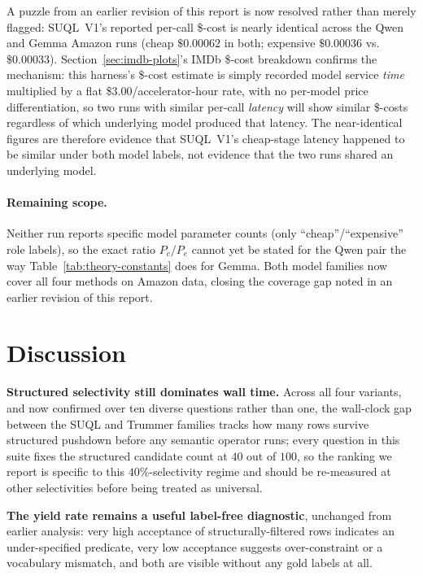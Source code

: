 A puzzle from an earlier revision of this report is now resolved rather
than merely flagged: SUQL~V1's reported per-call \$-cost is nearly
identical across the Qwen and Gemma Amazon runs (cheap $\$0.00062$ in
both; expensive $\$0.00036$ vs.\ $\$0.00033$). Section~\ref{sec:imdb-plots}'s
IMDb \$-cost breakdown confirms the mechanism: this harness's \$-cost
estimate is simply recorded model service \emph{time} multiplied by a
flat \$3.00/accelerator-hour rate, with no per-model price
differentiation, so two runs with similar per-call \emph{latency} will
show similar \$-costs regardless of which underlying model produced
that latency. The near-identical figures are therefore evidence that
SUQL~V1's cheap-stage latency happened to be similar under both model
labels, not evidence that the two runs shared an underlying model.

\paragraph{Remaining scope.} Neither run reports specific model
parameter counts (only ``cheap''/``expensive'' role labels), so the
exact ratio $P_c/P_e$ cannot yet be stated for the Qwen pair the way
Table~\ref{tab:theory-constants} does for Gemma. Both model families
now cover all four methods on Amazon data, closing the coverage gap
noted in an earlier revision of this report.

\section{Discussion}

\textbf{Structured selectivity still dominates wall time.} Across all
four variants, and now confirmed over ten diverse questions rather than
one, the wall-clock gap between the SUQL and Trummer families tracks how
many rows survive structured pushdown before any semantic operator runs;
every question in this suite fixes the structured candidate count at
$40$ out of $100$, so the ranking we report is specific to this
$40\%$-selectivity regime and should be re-measured at other
selectivities before being treated as universal.

\textbf{The \answerfn{} yield rate remains a useful label-free
diagnostic}, unchanged from earlier analysis: very high acceptance
of structurally-filtered rows indicates an under-specified predicate,
very low acceptance suggests over-constraint or a vocabulary mismatch,
and both are visible without any gold labels at all.

